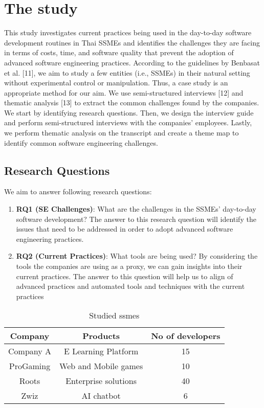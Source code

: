 \documentclass[conference]{IEEEtran}
\begin{document}
\section{The study}
This study investigates current practices being used in the
day-to-day software development routines in Thai SSMEs and
identifies the challenges they are facing in terms of costs, time,
and software quality that prevent the adoption of advanced
software engineering practices. According to the guidelines
by Benbasat et al. [11], we aim to study a few entities (i.e.,
SSMEs) in their natural setting without experimental control or
manipulation. Thus, a case study is an appropriate method for
our aim. We use semi-structured interviews [12] and thematic
analysis [13] to extract the common challenges found by the
companies. We start by identifying research questions. Then,
we design the interview guide and perform semi-structured
interviews with the companies’ employees. Lastly, we perform
thematic analysis on the transcript and create a theme map to
identify common software engineering challenges.

\subsection{Research Questions}We aim to answer following research questions:
\begin{enumerate}
\item \textbf{RQ1 (SE Challenges)}: What are the challenges in the
SSMEs’ day-to-day software development? The answer
to this research question will identify the issues that need
to be addressed in order to adopt advanced software
engineering practices.

\item \textbf{RQ2 (Current Practices)}: What tools are being used?
By considering the tools the companies are using as a
proxy, we can gain insights into their current practices.
The answer to this question will help us to align  of advanced practices and automated tools
and techniques with the current practices
\end{enumerate}

\begin{table}[htpb]
\caption{Studied ssmes}
\begin{center}
\begin{tabular}{c | c | c}
\hline
Company & Products & No of developers\\[0.5ex]
\hline 
Company A & E Learning Platform & 15\\[0.5ex]
ProGaming & Web and Mobile games & 10\\[0.5ex]
Roots & Enterprise solutions & 40\\[0.5ex]
Zwiz & AI chatbot & 6\\[0.5ex]
\hline
\end{tabular}
\end{center}
\end{table}
\end{document}
